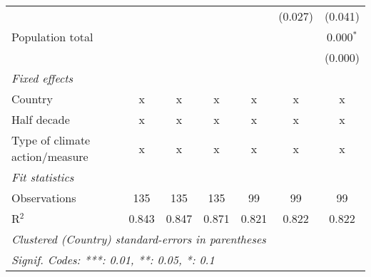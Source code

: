 \begin{tabular}{lcccccc}
                                                                                        &         &         &                &                & (0.027)        & (0.041)\\   
   Population total                                                                     &         &         &                &                &                & 0.000$^{*}$\\   
                                                                                        &         &         &                &                &                & (0.000)\\   
   \emph{Fixed effects}\\
   Country                                                                              & x       & x       & x              & x              & x              & x\\  
   Half decade                                                                          & x       & x       & x              & x              & x              & x\\  
   Type of climate action/measure                                                       & x       & x       & x              & x              & x              & x\\  
   \midrule \emph{Fit statistics}\\
   Observations                                                                         & 135     & 135     & 135            & 99             & 99             & 99\\  
   R$^2$                                                                                & 0.843   & 0.847   & 0.871          & 0.821          & 0.822          & 0.822\\  
   \midrule
   \multicolumn{7}{l}{\emph{Clustered (Country) standard-errors in parentheses}}\\
   \multicolumn{7}{l}{\emph{Signif. Codes: ***: 0.01, **: 0.05, *: 0.1}}\\
\end{tabular}
\par\endgroup


